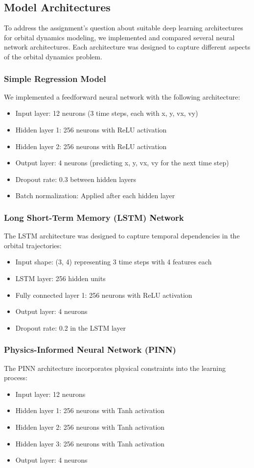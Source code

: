 \documentclass[12pt,a4paper]{article}
\begin{document}
\subsection{Model Architectures}
To address the assignment's question about suitable deep learning architectures for orbital dynamics modeling, we implemented and compared several neural network architectures. Each architecture was designed to capture different aspects of the orbital dynamics problem.

\subsubsection{Simple Regression Model}
We implemented a feedforward neural network with the following architecture:
\begin{itemize}
    \item Input layer: 12 neurons (3 time steps, each with x, y, vx, vy)
    \item Hidden layer 1: 256 neurons with ReLU activation
    \item Hidden layer 2: 256 neurons with ReLU activation
    \item Output layer: 4 neurons (predicting x, y, vx, vy for the next time step)
    \item Dropout rate: 0.3 between hidden layers
    \item Batch normalization: Applied after each hidden layer
\end{itemize}

\subsubsection{Long Short-Term Memory (LSTM) Network}
The LSTM architecture was designed to capture temporal dependencies in the orbital trajectories:
\begin{itemize}
    \item Input shape: (3, 4) representing 3 time steps with 4 features each
    \item LSTM layer: 256 hidden units
    \item Fully connected layer 1: 256 neurons with ReLU activation
    \item Output layer: 4 neurons
    \item Dropout rate: 0.2 in the LSTM layer
\end{itemize}

\subsubsection{Physics-Informed Neural Network (PINN)}
The PINN architecture incorporates physical constraints into the learning process:
\begin{itemize}
    \item Input layer: 12 neurons
    \item Hidden layer 1: 256 neurons with Tanh activation
    \item Hidden layer 2: 256 neurons with Tanh activation
    \item Hidden layer 3: 256 neurons with Tanh activation
    \item Output layer: 4 neurons
\end{itemize}
\end{document}
